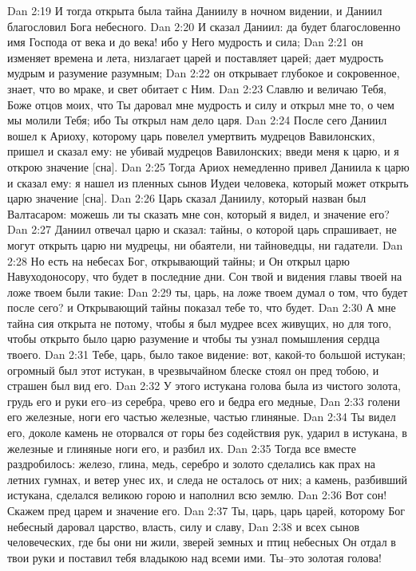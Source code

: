 Dan 2:19  И тогда открыта была тайна Даниилу в ночном видении, и Даниил благословил Бога небесного.
Dan 2:20  И сказал Даниил: да будет благословенно имя Господа от века и до века! ибо у Него мудрость и сила;
Dan 2:21  он изменяет времена и лета, низлагает царей и поставляет царей; дает мудрость мудрым и разумение разумным;
Dan 2:22  он открывает глубокое и сокровенное, знает, что во мраке, и свет обитает с Ним.
Dan 2:23  Славлю и величаю Тебя, Боже отцов моих, что Ты даровал мне мудрость и силу и открыл мне то, о чем мы молили Тебя; ибо Ты открыл нам дело царя.
Dan 2:24  После сего Даниил вошел к Ариоху, которому царь повелел умертвить мудрецов Вавилонских, пришел и сказал ему: не убивай мудрецов Вавилонских; введи меня к царю, и я открою значение [сна].
Dan 2:25  Тогда Ариох немедленно привел Даниила к царю и сказал ему: я нашел из пленных сынов Иудеи человека, который может открыть царю значение [сна].
Dan 2:26  Царь сказал Даниилу, который назван был Валтасаром: можешь ли ты сказать мне сон, который я видел, и значение его?
Dan 2:27  Даниил отвечал царю и сказал: тайны, о которой царь спрашивает, не могут открыть царю ни мудрецы, ни обаятели, ни тайноведцы, ни гадатели.
Dan 2:28  Но есть на небесах Бог, открывающий тайны; и Он открыл царю Навуходоносору, что будет в последние дни. Сон твой и видения главы твоей на ложе твоем были такие:
Dan 2:29  ты, царь, на ложе твоем думал о том, что будет после сего? и Открывающий тайны показал тебе то, что будет.
Dan 2:30  А мне тайна сия открыта не потому, чтобы я был мудрее всех живущих, но для того, чтобы открыто было царю разумение и чтобы ты узнал помышления сердца твоего.
Dan 2:31  Тебе, царь, было такое видение: вот, какой-то большой истукан; огромный был этот истукан, в чрезвычайном блеске стоял он пред тобою, и страшен был вид его.
Dan 2:32  У этого истукана голова была из чистого золота, грудь его и руки его--из серебра, чрево его и бедра его медные,
Dan 2:33  голени его железные, ноги его частью железные, частью глиняные.
Dan 2:34  Ты видел его, доколе камень не оторвался от горы без содействия рук, ударил в истукана, в железные и глиняные ноги его, и разбил их.
Dan 2:35  Тогда все вместе раздробилось: железо, глина, медь, серебро и золото сделались как прах на летних гумнах, и ветер унес их, и следа не осталось от них; а камень, разбивший истукана, сделался великою горою и наполнил всю землю.
Dan 2:36  Вот сон! Скажем пред царем и значение его.
Dan 2:37  Ты, царь, царь царей, которому Бог небесный даровал царство, власть, силу и славу,
Dan 2:38  и всех сынов человеческих, где бы они ни жили, зверей земных и птиц небесных Он отдал в твои руки и поставил тебя владыкою над всеми ими. Ты--это золотая голова!
